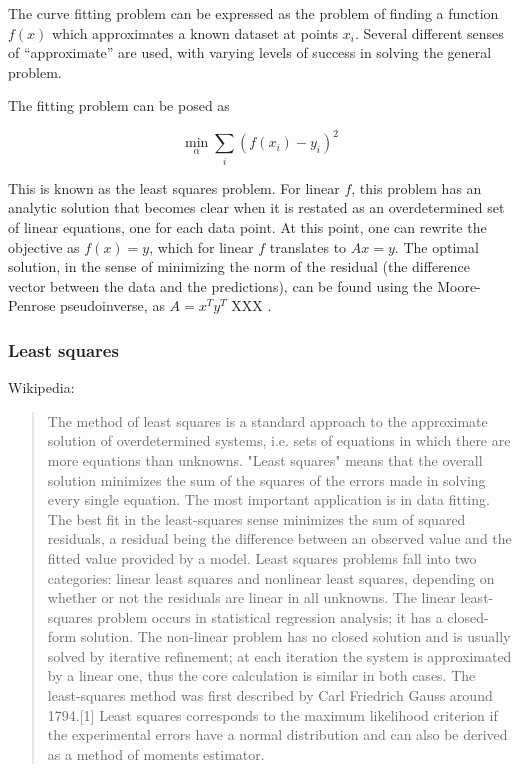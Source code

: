The curve fitting problem can be expressed as the problem of finding a function $f(x)$ which approximates a known dataset at points $x_i$.
Several different senses of ``approximate'' are used, with varying levels of success in solving the general problem.

The fitting problem can be posed as

\begin{equation}
  \label{eq:1}
  \min_{\alpha} \sum_i (f(x_i) - y_i)^2
\end{equation}

This is known as the least squares problem. For linear $f$, this problem has an analytic solution that becomes clear when it is restated as an overdetermined set of linear equations, one for each data point.
At this point, one can rewrite the objective as $f(x) = y$, which for linear $f$ translates to $Ax=y$.
The optimal solution, in the sense of minimizing the norm of the residual (the difference vector between the data and the predictions), can be found using the Moore-Penrose pseudoinverse, as $A = x^Ty^T$ XXX .


\subsubsection{Least squares}
Wikipedia:
\begin{quote}
  The method of least squares is a standard approach to the approximate solution of overdetermined systems, i.e. sets of equations in which there are more equations than unknowns.
 "Least squares" means that the overall solution minimizes the sum of the squares of the errors made in solving every single equation.
 The most important application is in data fitting.
 The best fit in the least-squares sense minimizes the sum of squared residuals, a residual being the difference between an observed value and the fitted value provided by a model.
  Least squares problems fall into two categories: linear least squares and nonlinear least squares, depending on whether or not the residuals are linear in all unknowns.
  The linear least-squares problem occurs in statistical regression analysis; it has a closed-form solution.
  The non-linear problem has no closed solution and is usually solved by iterative refinement; at each iteration the system is approximated by a linear one, thus the core calculation is similar in both cases.
  The least-squares method was first described by Carl Friedrich Gauss around 1794.[1]
  Least squares corresponds to the maximum likelihood criterion if the experimental errors have a normal distribution and can also be derived as a method of moments estimator.
\end{quote}

